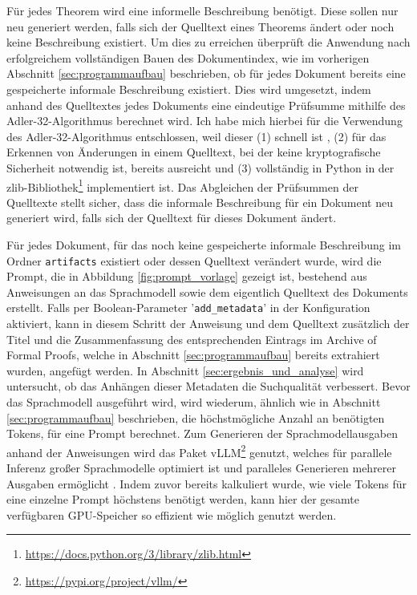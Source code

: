 \documentclass[12pt,letterpaper]{article} %
\begin{document}
Für jedes Theorem wird eine informelle Beschreibung benötigt.
Diese sollen nur neu generiert werden, falls sich der Quelltext eines Theorems ändert oder noch keine Beschreibung existiert.
Um dies zu erreichen überprüft die Anwendung nach erfolgreichem vollständigen Bauen des Dokumentindex, wie im vorherigen Abschnitt \ref{sec:programmaufbau} beschrieben, ob für jedes Dokument bereits eine gespeicherte informale Beschreibung existiert.
Dies wird umgesetzt, indem anhand des Quelltextes jedes Dokuments eine eindeutige Prüfsumme mithilfe des Adler-32-Algorithmus \citep[S. 7]{maxino_effectiveness_2009} berechnet wird.
Ich habe mich hierbei für die Verwendung des Adler-32-Algorithmus entschlossen, weil dieser (1) schnell ist \citep[S. 2]{maxino_effectiveness_2009}, (2) für das Erkennen von Änderungen in einem Quelltext, bei der keine kryptografische Sicherheit notwendig ist, bereits ausreicht und (3) vollständig in Python in der zlib-Bibliothek\footnote{\url{https://docs.python.org/3/library/zlib.html}} implementiert ist.
Das Abgleichen der Prüfsummen der Quelltexte stellt sicher, dass die informale Beschreibung für ein Dokument neu generiert wird, falls sich der Quelltext für dieses Dokument ändert.

Für jedes Dokument, für das noch keine gespeicherte informale Beschreibung im Ordner \texttt{artifacts} existiert oder dessen Quelltext verändert wurde, wird die Prompt, die in Abbildung \ref{fig:prompt_vorlage} gezeigt ist, bestehend aus Anweisungen an das Sprachmodell sowie dem eigentlich Quelltext des Dokuments erstellt.
Falls per Boolean-Parameter '\texttt{add\_metadata}' in der Konfiguration aktiviert, kann in diesem Schritt der Anweisung und dem Quelltext zusätzlich der Titel und die Zusammenfassung des entsprechenden Eintrags im Archive of Formal Proofs, welche in Abschnitt \ref{sec:programmaufbau} bereits extrahiert wurden, angefügt werden.
In Abschnitt \ref{sec:ergebnis_und_analyse} wird untersucht, ob das Anhängen dieser Metadaten die Suchqualität verbessert.
Bevor das Sprachmodell ausgeführt wird, wird wiederum, ähnlich wie in Abschnitt \ref{sec:programmaufbau} beschrieben, die höchstmögliche Anzahl an benötigten Tokens, für eine Prompt berechnet.
Zum Generieren der Sprachmodellausgaben anhand der Anweisungen wird das Paket vLLM\footnote{\url{https://pypi.org/project/vllm/}} genutzt, welches für parallele Inferenz großer Sprachmodelle optimiert ist und paralleles Generieren mehrerer Ausgaben ermöglicht \citep[S. 7]{guo_gllm_2025}.
Indem zuvor bereits kalkuliert wurde, wie viele Tokens für eine einzelne Prompt höchstens benötigt werden, kann hier der gesamte verfügbaren GPU-Speicher so effizient wie möglich genutzt werden.
\end{document}
